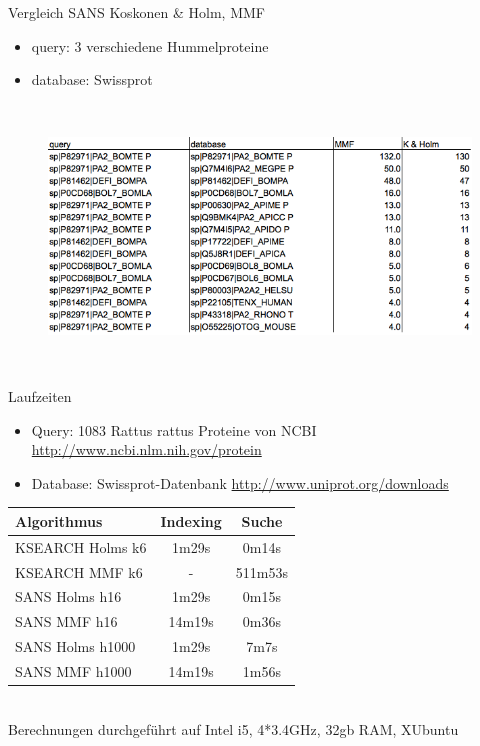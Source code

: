 \documentclass[xcolor=dvipsnames, aspectratio=1610]{beamer}
\begin{document}
\begin{frame}{Vergleich SANS Koskonen \& Holm, MMF}
  \begin{itemize}
  \item query: 3 verschiedene Hummelproteine
  \item database: Swissprot
  \end{itemize}
  \begin{figure}[h]
    \includegraphics[height=7cm]{img/table_MMF_Holm.png}
  \end{figure}
\end{frame}

\begin{frame}{Laufzeiten}
  \begin{itemize}
    \item Query: 1083 Rattus rattus Proteine von NCBI \tiny{\url{http://www.ncbi.nlm.nih.gov/protein}}
    \item \normalsize{Database: Swissprot-Datenbank} \tiny{\url{http://www.uniprot.org/downloads}}
  \end{itemize}
  \begin{tabular}{l|cc}
    Algorithmus & Indexing & Suche \\
    \hline
    KSEARCH Holms k6 & 1m29s & 0m14s \\
    KSEARCH MMF k6 & -  & 511m53s \\
     SANS Holms h16 & 1m29s &  0m15s \\
       SANS MMF  h16 & 14m19s & 0m36s \\
     SANS Holms h1000 & 1m29s & 7m7s \\
       SANS MMF  h1000 & 14m19s & 1m56s \\
  \end{tabular}\\
  \tiny{Berechnungen durchgeführt auf Intel i5, 4*3.4GHz, 32gb RAM, XUbuntu}
\end{frame}
\end{document}
